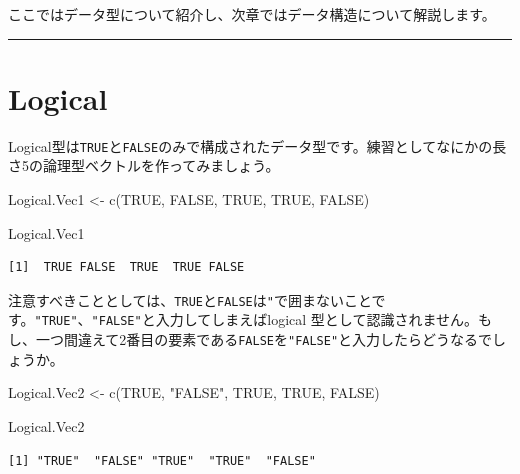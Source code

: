 \documentclass[
  a4paper,
  pandoc,
  ja=standard,
  jafont=haranoaji]{bxjsbook}
\newenvironment{Shaded}{\begin{snugshade}}{\end{snugshade}}
\newcommand{\ConstantTok}[1]{\textcolor[rgb]{0.56,0.35,0.01}{#1}}
\newcommand{\FunctionTok}[1]{\textcolor[rgb]{0.28,0.35,0.67}{#1}}
\newcommand{\NormalTok}[1]{\textcolor[rgb]{0.00,0.48,0.65}{#1}}
\newcommand{\OtherTok}[1]{\textcolor[rgb]{0.00,0.48,0.65}{#1}}
\newcommand{\StringTok}[1]{\textcolor[rgb]{0.13,0.47,0.30}{#1}}
\begin{document}
ここではデータ型について紹介し、次章ではデータ構造について解説します。

\begin{center}\rule{0.5\linewidth}{0.5pt}\end{center}

\hypertarget{sec-type_logical}{%
\section{Logical}\label{sec-type_logical}}

Logical型は\texttt{TRUE}と\texttt{FALSE}のみで構成されたデータ型です。練習としてなにかの長さ5の論理型ベクトルを作ってみましょう。

\begin{Shaded}
\begin{Highlighting}[numbers=left,,]
\NormalTok{Logical.Vec1 }\OtherTok{\textless{}{-}} \FunctionTok{c}\NormalTok{(}\ConstantTok{TRUE}\NormalTok{, }\ConstantTok{FALSE}\NormalTok{, }\ConstantTok{TRUE}\NormalTok{, }\ConstantTok{TRUE}\NormalTok{, }\ConstantTok{FALSE}\NormalTok{)}

\NormalTok{Logical.Vec1}
\end{Highlighting}
\end{Shaded}

\begin{verbatim}
[1]  TRUE FALSE  TRUE  TRUE FALSE
\end{verbatim}

注意すべきこととしては、\texttt{TRUE}と\texttt{FALSE}は\texttt{"}で囲まないことです。\texttt{"TRUE"}、\texttt{"FALSE"}と入力してしまえばlogical
型として認識されません。もし、一つ間違えて2番目の要素である\texttt{FALSE}を\texttt{"FALSE"}と入力したらどうなるでしょうか。

\begin{Shaded}
\begin{Highlighting}[numbers=left,,]
\NormalTok{Logical.Vec2 }\OtherTok{\textless{}{-}} \FunctionTok{c}\NormalTok{(}\ConstantTok{TRUE}\NormalTok{, }\StringTok{"FALSE"}\NormalTok{, }\ConstantTok{TRUE}\NormalTok{, }\ConstantTok{TRUE}\NormalTok{, }\ConstantTok{FALSE}\NormalTok{)}

\NormalTok{Logical.Vec2}
\end{Highlighting}
\end{Shaded}

\begin{verbatim}
[1] "TRUE"  "FALSE" "TRUE"  "TRUE"  "FALSE"
\end{verbatim}
\end{document}

